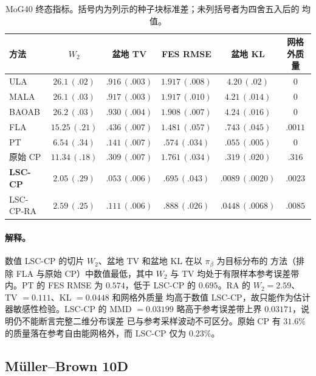 \documentclass[11pt,a4paper]{article}
\renewcommand{\textsc}[1]{\textsf{\MakeUppercase{#1}}}
\begin{document}
\begin{table}[H]
\centering
\footnotesize
\setlength{\tabcolsep}{4.2pt}
\begin{tabular}{lccccc}
\toprule
方法 & $W_2$ & 盆地 TV & FES RMSE & 盆地 KL & 网格外质量 \\
\midrule
\textsc{ula} & $26.1\,(.02)$ & $.916\,(.003)$ & $1.917\,(.008)$ & $4.20\,(.02)$ & $0$ \\
\textsc{mala} & $26.1\,(.03)$ & $.917\,(.003)$ & $1.917\,(.010)$ & $4.21\,(.014)$ & $0$ \\
\textsc{baoab} & $26.2\,(.03)$ & $.930\,(.004)$ & $1.908\,(.007)$ & $4.24\,(.016)$ & $0$ \\
\textsc{fla} & $15.25\,(.21)$ & $.436\,(.007)$ & $1.481\,(.057)$ & $.743\,(.045)$ & $.0011$ \\
\textsc{pt} & $6.54\,(.34)$ & $.141\,(.007)$ & $.574\,(.034)$ & $.055\,(.005)$ & $0$ \\
原始 \textsc{cp} & $11.34\,(.18)$ & $.309\,(.007)$ & $1.761\,(.034)$ & $.319\,(.020)$ & $.316$ \\
\textbf{\textsc{lsc-cp}} & $2.05\,(.29)$ & $.053\,(.006)$ & $.695\,(.043)$ & $.0089\,(.0020)$ & $.0023$ \\
\textsc{lsc-cp-ra} & $2.59\,(.25)$ & $.111\,(.006)$ & $.888\,(.026)$ & $.0448\,(.0068)$ & $.0085$ \\
\bottomrule
\end{tabular}
\caption{MoG40 终态指标。括号内为列示的种子块标准差；未列括号者为四舍五入后的
均值。}
\end{table}

\paragraph{解释。}
数值 LSC-CP 的切片 $W_2$、盆地 TV 和盆地 KL 在以 $\pi_\beta$ 为目标分布的
方法（排除 FLA 与原始 CP）中数值最低，其中
$W_2$ 与 TV 均处于有限样本参考误差带内。PT 的 FES RMSE 为 $0.574$，低于
LSC-CP 的 $0.695$。RA 的 $W_2=2.59$、TV $=0.111$、KL $=0.0448$ 和网格外质量
均高于数值 LSC-CP，故只能作为估计器敏感性检验。LSC-CP 的
MMD $=0.03199$ 略高于参考误差带上界 $0.03171$，说明仍不能断言完整二维分布误差
已与参考采样波动不可区分。原始 CP 有 $31.6\%$ 的质量落在参考自由能网格外，而
LSC-CP 仅为 $0.23\%$。

\subsection{Müller--Brown 10D}
\end{document}
